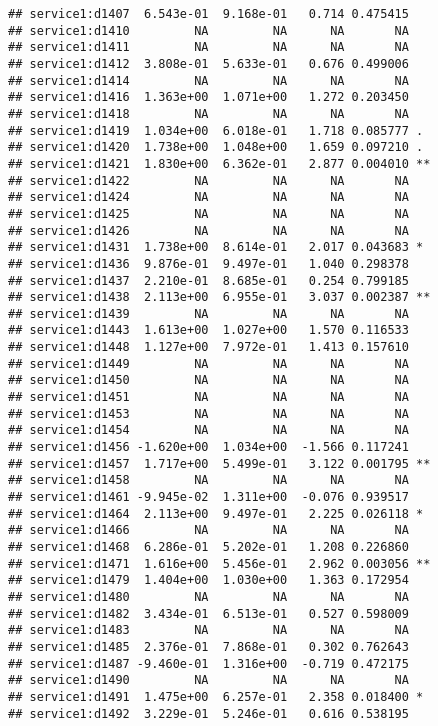 \documentclass[
]{article}
\begin{document}
\begin{verbatim}
## service1:d1407  6.543e-01  9.168e-01   0.714 0.475415    
## service1:d1410         NA         NA      NA       NA    
## service1:d1411         NA         NA      NA       NA    
## service1:d1412  3.808e-01  5.633e-01   0.676 0.499006    
## service1:d1414         NA         NA      NA       NA    
## service1:d1416  1.363e+00  1.071e+00   1.272 0.203450    
## service1:d1418         NA         NA      NA       NA    
## service1:d1419  1.034e+00  6.018e-01   1.718 0.085777 .  
## service1:d1420  1.738e+00  1.048e+00   1.659 0.097210 .  
## service1:d1421  1.830e+00  6.362e-01   2.877 0.004010 ** 
## service1:d1422         NA         NA      NA       NA    
## service1:d1424         NA         NA      NA       NA    
## service1:d1425         NA         NA      NA       NA    
## service1:d1426         NA         NA      NA       NA    
## service1:d1431  1.738e+00  8.614e-01   2.017 0.043683 *  
## service1:d1436  9.876e-01  9.497e-01   1.040 0.298378    
## service1:d1437  2.210e-01  8.685e-01   0.254 0.799185    
## service1:d1438  2.113e+00  6.955e-01   3.037 0.002387 ** 
## service1:d1439         NA         NA      NA       NA    
## service1:d1443  1.613e+00  1.027e+00   1.570 0.116533    
## service1:d1448  1.127e+00  7.972e-01   1.413 0.157610    
## service1:d1449         NA         NA      NA       NA    
## service1:d1450         NA         NA      NA       NA    
## service1:d1451         NA         NA      NA       NA    
## service1:d1453         NA         NA      NA       NA    
## service1:d1454         NA         NA      NA       NA    
## service1:d1456 -1.620e+00  1.034e+00  -1.566 0.117241    
## service1:d1457  1.717e+00  5.499e-01   3.122 0.001795 ** 
## service1:d1458         NA         NA      NA       NA    
## service1:d1461 -9.945e-02  1.311e+00  -0.076 0.939517    
## service1:d1464  2.113e+00  9.497e-01   2.225 0.026118 *  
## service1:d1466         NA         NA      NA       NA    
## service1:d1468  6.286e-01  5.202e-01   1.208 0.226860    
## service1:d1471  1.616e+00  5.456e-01   2.962 0.003056 ** 
## service1:d1479  1.404e+00  1.030e+00   1.363 0.172954    
## service1:d1480         NA         NA      NA       NA    
## service1:d1482  3.434e-01  6.513e-01   0.527 0.598009    
## service1:d1483         NA         NA      NA       NA    
## service1:d1485  2.376e-01  7.868e-01   0.302 0.762643    
## service1:d1487 -9.460e-01  1.316e+00  -0.719 0.472175    
## service1:d1490         NA         NA      NA       NA    
## service1:d1491  1.475e+00  6.257e-01   2.358 0.018400 *  
## service1:d1492  3.229e-01  5.246e-01   0.616 0.538195    

\end{verbatim}
\end{document}
